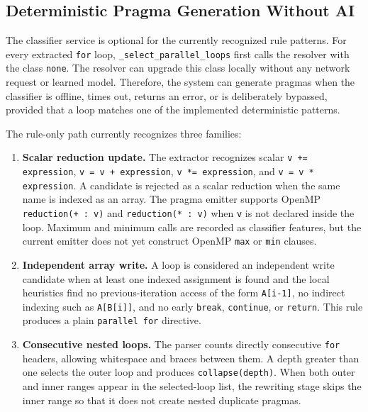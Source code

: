 \documentclass[12pt,a4paper,oneside]{report}
\begin{document}
\subsection{Deterministic Pragma Generation Without AI}

The classifier service is optional for the currently recognized rule patterns.
For every extracted \texttt{for} loop, \texttt{\_select\_parallel\_loops}
first calls the resolver with the class \texttt{none}. The resolver can upgrade
this class locally without any network request or learned model. Therefore, the
system can generate pragmas when the classifier is offline, times out, returns
an error, or is deliberately bypassed, provided that a loop matches one of the
implemented deterministic patterns.

The rule-only path currently recognizes three families:

\begin{enumerate}[leftmargin=1.2cm]
  \item \textbf{Scalar reduction update.} The extractor recognizes scalar
  \texttt{v += expression}, \texttt{v = v + expression},
  \texttt{v *= expression}, and \texttt{v = v * expression}. A candidate is
  rejected as a scalar reduction when the same name is indexed as an array.
  The pragma emitter supports OpenMP \texttt{reduction(+ : v)} and
  \texttt{reduction(* : v)} when \texttt{v} is not declared inside the loop.
  Maximum and minimum calls are recorded as classifier features, but the current
  emitter does not yet construct OpenMP \texttt{max} or \texttt{min} clauses.

  \item \textbf{Independent array write.} A loop is considered an independent
  write candidate when at least one indexed assignment is found and the local
  heuristics find no previous-iteration access of the form \texttt{A[i-1]}, no
  indirect indexing such as \texttt{A[B[i]]}, and no early
  \texttt{break}, \texttt{continue}, or \texttt{return}. This rule produces a
  plain \texttt{parallel for} directive.

  \item \textbf{Consecutive nested loops.} The parser counts directly
  consecutive \texttt{for} headers, allowing whitespace and braces between
  them. A depth greater than one selects the outer loop and produces
  \texttt{collapse(depth)}. When both outer and inner ranges appear in the
  selected-loop list, the rewriting stage skips the inner range so that it does
  not create nested duplicate pragmas.
\end{enumerate}
\end{document}
